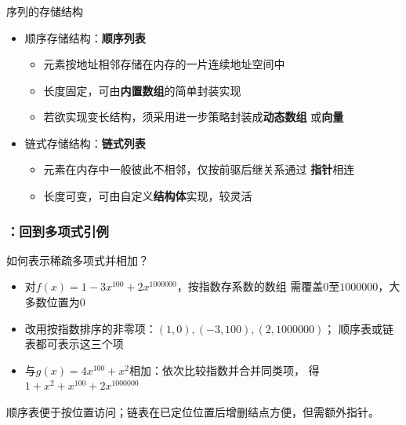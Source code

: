 \begin{frame}
    \frametitle{\insertsectionhead}
    \begin{block}{序列的存储结构}
        \begin{itemize}
            \item 顺序存储结构：\textbf{顺序列表}
            \begin{itemize}
                \item 元素按地址相邻存储在内存的一片\alert{连续}地址空间中
                \item 长度\alert{固定}，可由\textbf{内置数组}的简单封装实现
                \item 若欲实现变长结构，须采用进一步策略封装成\textbf{动态数组}
                      或\textbf{向量}
            \end{itemize}
            \item 链式存储结构：\textbf{链式列表}
            \begin{itemize}
                \item 元素在内存中一般彼此\alert{不相邻}，仅按前驱后继关系通过
                      \textbf{指针}相连
                \item 长度\alert{可变}，可由自定义\textbf{结构体}实现，较灵活
            \end{itemize}
        \end{itemize}
    \end{block}
\end{frame}




\begin{frame}
    \frametitle{\insertsectionhead：回到多项式引例}
    \begin{exampleblock}{如何表示稀疏多项式并相加？}
        \begin{itemize}
            \item 对$f(x)=1-3x^{100}+2x^{1000000}$，按指数存系数的数组
                  需覆盖$0$至$1000000$，大多数位置为$0$
            \item 改用按指数排序的非零项：$(1,0),(-3,100),(2,1000000)$；
                  顺序表或链表都可表示这三个项
            \item 与$g(x)=4x^{100}+x^2$相加：依次比较指数并合并同类项，
                  得$1+x^2+x^{100}+2x^{1000000}$
        \end{itemize}
    \end{exampleblock}
    顺序表便于按位置访问；链表在已定位位置后增删结点方便，但需额外指针。
\end{frame}
